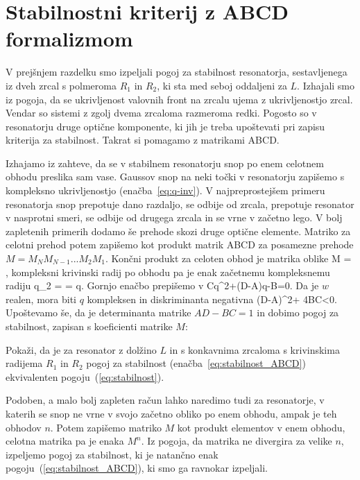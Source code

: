 \section{Stabilnostni kriterij z ABCD formalizmom}
V prejšnjem razdelku smo izpeljali pogoj za stabilnost resonatorja, 
sestavljenega iz dveh zrcal s polmeroma $R_1$ in $R_2$, ki sta med 
seboj oddaljeni za $L$. Izhajali smo iz pogoja, da se ukrivljenost
valovnih front na zrcalu ujema z ukrivljenostjo zrcal. Vendar so sistemi z
zgolj dvema zrcaloma razmeroma redki. Pogosto so v resonatorju
druge optične komponente, ki jih je treba upoštevati pri zapisu
kriterija za stabilnost. Takrat si pomagamo z matrikami ABCD. 

Izhajamo iz zahteve, da se v stabilnem resonatorju snop po enem celotnem obhodu
preslika sam vase. Gaussov snop na neki točki v resonatorju 
zapišemo s kompleksno ukrivljenostjo (enačba~\ref{eq:q-inv}).
V najpreprostejšem primeru resonatorja snop prepotuje dano razdaljo, se odbije od zrcala, prepotuje
resonator v nasprotni smeri, se odbije od drugega zrcala in se vrne v začetno lego. V bolj 
zapletenih primerih dodamo še prehode skozi druge optične elemente. Matriko 
za celotni prehod potem zapišemo kot produkt matrik ABCD za posamezne prehode $M = M_N M_{N-1} ...M_2 M_1$.
Končni produkt za celoten obhod je matrika oblike
\beq
M = \left[\begin{array}{cc}
A & B\\
C & D
\end{array}\right],
\eeq
kompleksni krivinski radij po obhodu pa je enak začetnemu kompleksnemu radiju
\beq
q_2 =  = q.
\eeq
Gornjo enačbo prepišemo v 
\beq
Cq^2+(D-A)q-B=0.
\eeq
Da je $w$ realen, mora biti $q$ kompleksen in diskriminanta negativna
\beq
(D-A)^2+ 4BC<0.
\eeq
Upoštevamo še, da je determinanta matrike $AD-BC=1$ in dobimo pogoj za 
stabilnost, zapisan s koeficienti matrike $M$:

\begin{definition}
Pokaži, da je za resonator z dolžino $L$ in s konkavnima zrcaloma s krivinskima radijema $R_1$ in $R_2$ 
pogoj za stabilnost (enačba~\ref{eq:stabilnost_ABCD}) ekvivalenten pogoju~(\ref{eq:stabilnost}).
\end{definition}

\begin{remark}
Podoben, a malo bolj zapleten račun lahko naredimo tudi za resonatorje, v katerih se snop 
ne vrne v svojo začetno obliko po enem obhodu, ampak je teh obhodov $n$. Potem zapišemo
matriko $M$ kot produkt elementov v enem obhodu, celotna matrika pa je enaka $M^n$. Iz pogoja,
da matrika ne divergira za velike $n$, izpeljemo pogoj za stabilnost, ki je natančno 
enak pogoju~(\ref{eq:stabilnost_ABCD}), ki smo ga ravnokar izpeljali. 
\end{remark}

